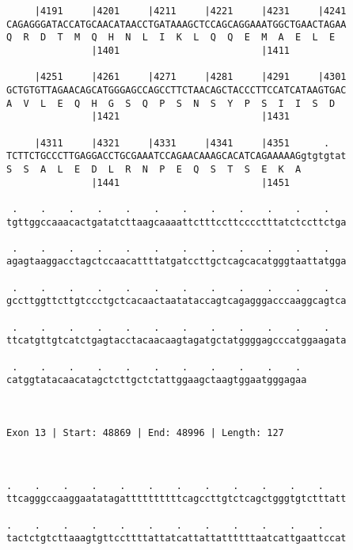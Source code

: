 \documentclass{article}
\begin{document}
\begin{Verbatim}
     |4191     |4201     |4211     |4221     |4231     |4241
CAGAGGGATACCATGCAACATAACCTGATAAAGCTCCAGCAGGAAATGGCTGAACTAGAA
Q  R  D  T  M  Q  H  N  L  I  K  L  Q  Q  E  M  A  E  L  E  
               |1401                         |1411          
  
     |4251     |4261     |4271     |4281     |4291     |4301
GCTGTGTTAGAACAGCATGGGAGCCAGCCTTCTAACAGCTACCCTTCCATCATAAGTGAC
A  V  L  E  Q  H  G  S  Q  P  S  N  S  Y  P  S  I  I  S  D  
               |1421                         |1431          
  
     |4311     |4321     |4331     |4341     |4351      .   
TCTTCTGCCCTTGAGGACCTGCGAAATCCAGAACAAAGCACATCAGAAAAAGgtgtgtat
S  S  A  L  E  D  L  R  N  P  E  Q  S  T  S  E  K  A        
               |1441                         |1451          
  
 .    .    .    .    .    .    .    .    .    .    .    .   
tgttggccaaacactgatatcttaagcaaaattctttccttcccctttatctccttctga
                                                            
 .    .    .    .    .    .    .    .    .    .    .    .   
agagtaaggacctagctccaacattttatgatccttgctcagcacatgggtaattatgga
                                                            
 .    .    .    .    .    .    .    .    .    .    .    .   
gccttggttcttgtccctgctcacaactaatataccagtcagagggacccaaggcagtca
                                                            
 .    .    .    .    .    .    .    .    .    .    .    .   
ttcatgttgtcatctgagtacctacaacaagtagatgctatggggagcccatggaagata
                                                            
 .    .    .    .    .    .    .    .    .    .    . 
catggtatacaacatagctcttgctctattggaagctaagtggaatgggagaa
                                                     
                                                     
 
Exon 13 | Start: 48869 | End: 48996 | Length: 127



.    .    .    .    .    .    .    .    .    .    .    .    
ttcagggccaaggaatatagattttttttttcagccttgtctcagctgggtgtctttatt
                                                            
.    .    .    .    .    .    .    .    .    .    .    .    
tactctgtcttaaagtgttccttttattatcattattattttttaatcattgaattccat
                                                            

\end{Verbatim}
\end{document}
